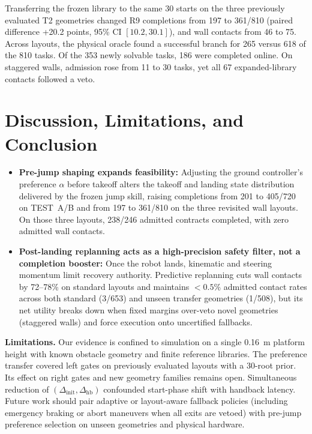 \documentclass[letterpaper,10pt,conference]{ieeeconf}
\begin{document}
Transferring the frozen library to the same 30 starts on the three previously evaluated T2 geometries changed R9 completions from 197 to 361/810 (paired difference +20.2 points, 95\% CI $[10.2, 30.1]$), and wall contacts from 46 to 75. Across layouts, the physical oracle found a successful branch for 265 versus 618 of the 810 tasks. Of the 353 newly solvable tasks, 186 were completed online. On staggered walls, admission rose from 11 to 30 tasks, yet all 67 expanded-library contacts followed a veto.

\section{Discussion, Limitations, and Conclusion}
\begin{itemize}
\item \textbf{Pre-jump shaping expands feasibility:} Adjusting the ground controller's preference $\alpha$ before takeoff alters the takeoff and landing state distribution delivered by the frozen jump skill, raising completions from 201 to 405/720 on TEST~A/B and from 197 to 361/810 on the three revisited wall layouts. On those three layouts, 238/246 admitted contracts completed, with zero admitted wall contacts.
\item \textbf{Post-landing replanning acts as a high-precision safety filter, not a completion booster:} Once the robot lands, kinematic and steering momentum limit recovery authority. Predictive replanning cuts wall contacts by 72--78\% on standard layouts and maintains $<0.5\%$ admitted contact rates across both standard (3/653) and unseen transfer geometries (1/508), but its net utility breaks down when fixed margins over-veto novel geometries (staggered walls) and force execution onto uncertified fallbacks.
\end{itemize}

\textbf{Limitations.} Our evidence is confined to simulation on a single 0.16~m platform height with known obstacle geometry and finite reference libraries. The preference transfer covered left gates on previously evaluated layouts with a 30-root prior. Its effect on right gates and new geometry families remains open. Simultaneous reduction of $(\Delta_{\mathrm{init}},\Delta_{\mathrm{hb}})$ confounded start-phase shift with handback latency. Future work should pair adaptive or layout-aware fallback policies (including emergency braking or abort maneuvers when all exits are vetoed) with pre-jump preference selection on unseen geometries and physical hardware.


\end{document}

